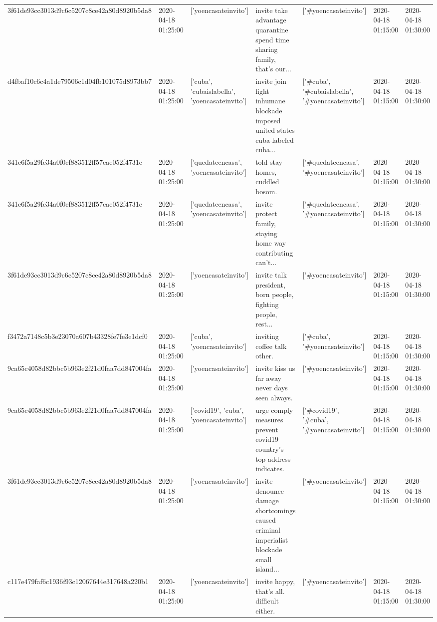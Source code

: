 \begin{tabular}{lllllll}
3f61de93cc3013d9c6c5207c8ce42a80d8920b5da8 & 2020-04-18 01:25:00 & ['yoencasateinvito'] & invite take advantage quarantine spend time sharing family, that's our... & ['#yoencasateinvito'] & 2020-04-18 01:15:00 & 2020-04-18 01:30:00 \\
d4fbaf10c6c4a1de79506c1d04fb101075d8973bb7 & 2020-04-18 01:25:00 & ['cuba', 'cubaislabella', 'yoencasateinvito'] & invite join fight inhumane blockade imposed united states cuba-labeled cuba... & ['#cuba', '#cubaislabella', '#yoencasateinvito'] & 2020-04-18 01:15:00 & 2020-04-18 01:30:00 \\
341c6f5a29fc34a0f0cf883512ff57cae052f4731e & 2020-04-18 01:25:00 & ['quedateencasa', 'yoencasateinvito'] & told stay homes, cuddled bosom. & ['#quedateencasa', '#yoencasateinvito'] & 2020-04-18 01:15:00 & 2020-04-18 01:30:00 \\
341c6f5a29fc34a0f0cf883512ff57cae052f4731e & 2020-04-18 01:25:00 & ['quedateencasa', 'yoencasateinvito'] & invite protect family, staying home way contributing can't... & ['#quedateencasa', '#yoencasateinvito'] & 2020-04-18 01:15:00 & 2020-04-18 01:30:00 \\
3f61de93cc3013d9c6c5207c8ce42a80d8920b5da8 & 2020-04-18 01:25:00 & ['yoencasateinvito'] & invite talk president, born people, fighting people, rest... & ['#yoencasateinvito'] & 2020-04-18 01:15:00 & 2020-04-18 01:30:00 \\
f3472a7148c5b3e23070a607b43328fe7fe3e1dcf0 & 2020-04-18 01:25:00 & ['cuba', 'yoencasateinvito'] & inviting coffee talk other. & ['#cuba', '#yoencasateinvito'] & 2020-04-18 01:15:00 & 2020-04-18 01:30:00 \\
9ca65c4058d82bbc5b963e2f21d0faa7dd847004fa & 2020-04-18 01:25:00 & ['yoencasateinvito'] & invite kiss us far away never days seen always. & ['#yoencasateinvito'] & 2020-04-18 01:15:00 & 2020-04-18 01:30:00 \\
9ca65c4058d82bbc5b963e2f21d0faa7dd847004fa & 2020-04-18 01:25:00 & ['covid19', 'cuba', 'yoencasateinvito'] & urge comply measures prevent covid19 country's top address indicates. & ['#covid19', '#cuba', '#yoencasateinvito'] & 2020-04-18 01:15:00 & 2020-04-18 01:30:00 \\
3f61de93cc3013d9c6c5207c8ce42a80d8920b5da8 & 2020-04-18 01:25:00 & ['yoencasateinvito'] & invite denounce damage shortcomings caused criminal imperialist blockade small island... & ['#yoencasateinvito'] & 2020-04-18 01:15:00 & 2020-04-18 01:30:00 \\
c117e479faf6c1936f93c12067644e317648a220b1 & 2020-04-18 01:25:00 & ['yoencasateinvito'] & invite happy, that's all. difficult either. & ['#yoencasateinvito'] & 2020-04-18 01:15:00 & 2020-04-18 01:30:00 \\

\end{tabular}
